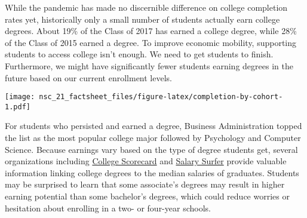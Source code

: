 \documentclass[
  11pt,
]{article}
\begin{document}
\newpage{}


While the pandemic has made no discernible difference on college
completion rates yet, historically only a small number of students
actually earn college degrees. About 19\% of the Class of 2017 has
earned a college degree, while 28\% of the Class of 2015 earned a
degree. To improve economic mobility, supporting students to access
college isn't enough. We need to get students to finish. Furthermore, we
might have significantly fewer students earning degrees in the future
based on our current enrollment levels.


\texttt{[image: nsc\_21\_factsheet\_files/figure-latex/completion-by-cohort-1.pdf]}

\newpage{}


For students who persisted and earned a degree, Business Administration
topped the list as the most popular college major followed by Psychology
and Computer Science. Because earnings vary based on the type of degree
students get, several organizations including
\href{https://collegescorecard.ed.gov/}{College Scorecard} and
\href{https://salarysurfer.cccco.edu/SalarySurfer.aspx}{Salary Surfer}
provide valuable information linking college degrees to the median
salaries of graduates. Students may be surprised to learn that some
associate's degrees may result in higher earning potential than some
bachelor's degrees, which could reduce worries or hesitation about
enrolling in a two- or four-year schools.

\end{document}
